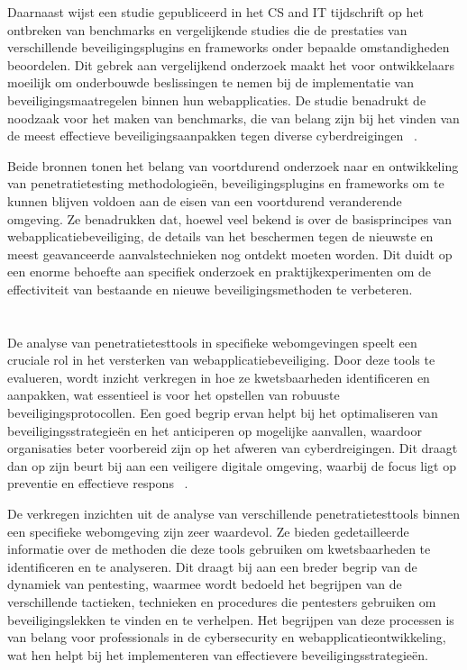 Daarnaast wijst een studie gepubliceerd in het CS and IT tijdschrift op het ontbreken van benchmarks en vergelijkende studies die de prestaties van verschillende 
beveiligingsplugins en frameworks onder bepaalde omstandigheden beoordelen. Dit gebrek aan vergelijkend onderzoek maakt het voor ontwikkelaars 
moeilijk om onderbouwde beslissingen te nemen bij de implementatie van beveiligingsmaatregelen binnen hun webapplicaties. De studie benadrukt de noodzaak voor 
het maken van benchmarks, die van belang zijn bij het vinden van de meest effectieve beveiligingsaanpakken tegen diverse cyberdreigingen ~\autocite{AbuDabaseh2018}.

Beide bronnen tonen het belang van voortdurend onderzoek naar en ontwikkeling van penetratietesting methodologieën, beveiligingsplugins en frameworks om te kunnen 
blijven voldoen aan de eisen van een voortdurend veranderende omgeving. Ze benadrukken dat, hoewel veel bekend is over de basisprincipes van webapplicatiebeveiliging, 
de details van het beschermen tegen de nieuwste en meest geavanceerde aanvalstechnieken nog ontdekt moeten worden. Dit duidt op een enorme behoefte aan 
specifiek onderzoek en praktijkexperimenten om de effectiviteit van bestaande en nieuwe beveiligingsmethoden te verbeteren.

\section{}
\subsection{}
De analyse van penetratietesttools in specifieke webomgevingen speelt een cruciale rol in het versterken van webapplicatiebeveiliging. Door deze tools 
te evalueren, wordt inzicht verkregen in hoe ze kwetsbaarheden identificeren en aanpakken, wat essentieel is voor het opstellen van robuuste beveiligingsprotocollen. 
Een goed begrip ervan helpt bij het optimaliseren van beveiligingsstrategieën en het anticiperen op mogelijke aanvallen, waardoor organisaties beter voorbereid zijn op het 
afweren van cyberdreigingen. Dit draagt dan op zijn beurt bij aan een veiligere digitale omgeving, waarbij de focus ligt op preventie en effectieve respons
~\autocite{Jarupunphol2023}.

De verkregen inzichten uit de analyse van verschillende penetratietesttools binnen een specifieke webomgeving zijn zeer waardevol. Ze bieden gedetailleerde informatie 
over de methoden die deze tools gebruiken om kwetsbaarheden te identificeren en te analyseren. Dit draagt bij aan een breder begrip van de dynamiek van pentesting, waarmee 
wordt bedoeld het begrijpen van de verschillende tactieken, technieken en procedures die pentesters gebruiken om beveiligingslekken te vinden en te verhelpen. Het 
begrijpen van deze processen is van belang voor professionals in de cybersecurity en webapplicatieontwikkeling, wat hen helpt bij het implementeren van effectievere 
beveiligingsstrategieën.

